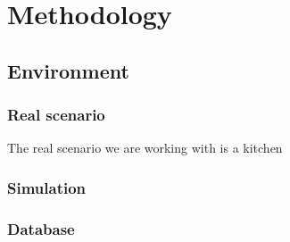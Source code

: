 
\chapter{Methodology}

\section{Environment}

    \subsection{Real scenario}

        The real scenario we are working with is a kitchen

    \subsection{Simulation}

    \subsection{Database}


